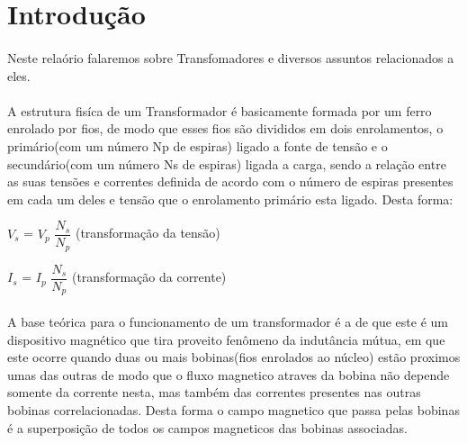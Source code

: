 \documentclass[a4paper, 12pt]{article}
\begin{document}
\newpage
{}
\section{Introdução}

\paragraph{}Neste relaório falaremos sobre Transfomadores e diversos assuntos relacionados a eles.

\paragraph{}A estrutura fisíca de um Transformador é basicamente formada por um ferro enrolado por fios, de modo que esses fios são divididos em dois enrolamentos, o primário(com um número Np de espiras) ligado a fonte de tensão e o secundário(com um número Ns de espiras) ligada a carga, sendo a relação entre as suas tensões e correntes definida de acordo com o número de espiras presentes em cada um deles e tensão que o enrolamento primário esta ligado. Desta forma:\\

\begin{mdframed}[backgroundcolor=gray!20]
\begin{center}
		$V_s$ = $V_p$ $\dfrac{N_s}{N_p}$ (transformação da tensão)
			\end{center}
    \begin{center}
		$I_s$ = $I_p$ $\dfrac{N_s}{N_p}$ (transformação da corrente)
			\end{center}
\end{mdframed}
	

\paragraph{}A base teórica para o funcionamento de um transformador é a de que este é um dispositivo magnético que tira proveito fenômeno da indutância mútua, em que este ocorre quando duas ou mais bobinas(fios enrolados ao núcleo) estão proximos umas das outras de modo que o fluxo magnetico atraves da bobina não depende somente da corrente nesta, mas também das correntes presentes nas outras bobinas correlacionadas. Desta forma o campo magnetico que passa pelas bobinas é a superposição de todos os campos magneticos das bobinas associadas. \\
\newpage
\end{document}

